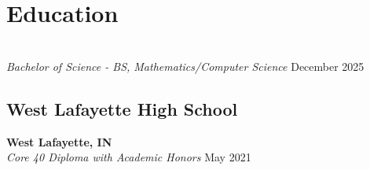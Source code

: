 \section{Education}
\\
\hspace*{1em} \emph{Bachelor of Science - BS, Mathematics/Computer Science} \hfill December 2025

\subsection{West Lafayette High School}{\textbf{West Lafayette, IN}}\\
\hspace*{1em} \emph{Core 40 Diploma with Academic Honors} \hfill May 2021

\vspace{0.2em}
